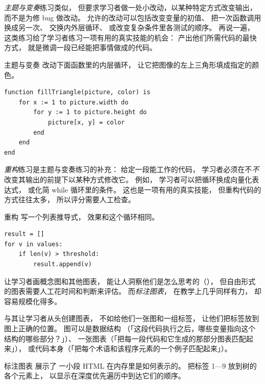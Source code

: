 \emph{主题与变奏}练习类似，
但要求学习者做一处小改动，以某种特定方式改变输出，
而不是为修 bug 做改动。
允许的改动可以包括改变变量的初值、
把一次函数调用换成另一次、
交换内外层循环、
或改变复杂条件里各测试的顺序。
再说一遍，
这类练习给了学习者练习一项有用的真实技能的机会：
产出他们所需代码的最快方式，
就是微调一段已经能把事情做成的代码。

\begin{aside}{主题与变奏}
  改动下面函数里的内层循环，
  让它把图像的左上三角形填成指定的颜色。

\begin{verbatim}
function fillTriangle(picture, color) is
    for x := 1 to picture.width do
        for y := 1 to picture.height do
            picture[x, y] = color
        end
    end
end
\end{verbatim}
\end{aside}

\emph{重构}练习是主题与变奏练习的补充：
给定一段能工作的代码，
学习者必须在不\emph{不}改变其输出的前提下以某种方式修改它。
例如，
学习者可以把循环换成向量化表达式，
或化简 while 循环里的条件。
这也是一项有用的真实技能，
但重构代码的方式往往太多，
所以评分需要人工检查。

\begin{aside}{重构}
  写一个列表推导式，
  效果和这个循环相同。

\begin{verbatim}
result = []
for v in values:
    if len(v) > threshold:
        result.append(v)
\end{verbatim}
\end{aside}


让学习者画概念图和其他图表，
能让人洞察他们是怎么思考的（），
但自由形式的图表需要人工花时间和判断来评估。
而\emph{标注图表}，
在教学上几乎同样有力，
却容易规模化得多。

与其让学习者从头创建图表，
不如给他们一张图和一组标签，
让他们把标签放到图上正确的位置。
图可以是数据结构
（「这段代码执行之后，哪些变量指向这个结构的哪些部分？」）、
一张图表（「把每一段代码和它生成的那部分图表匹配起来」），
或代码本身（「把每个术语和该程序元素的一个例子匹配起来」）。

\begin{aside}{标注图表}
  展示了
  一小段 HTML 在内存里是如何表示的。
  把标签 1—9 放到树的各个元素上，
  以显示在深度优先遍历中到达它们的顺序。
\end{aside}

